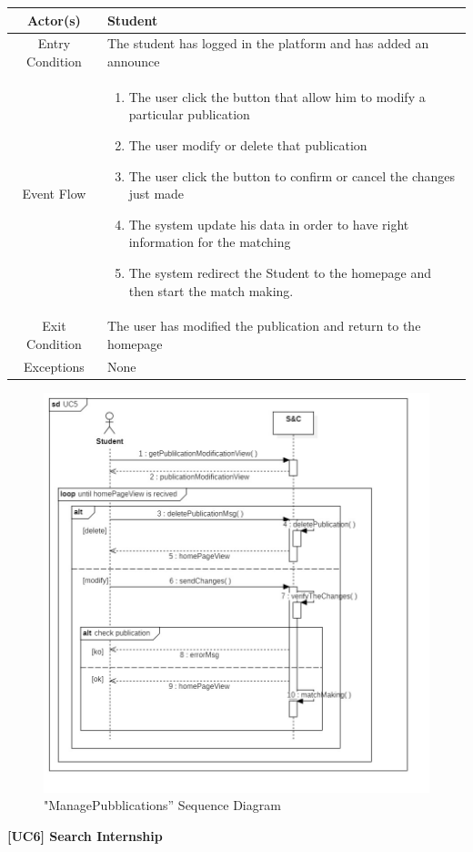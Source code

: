 \documentclass{article}
\begin{document}
\begin{table}[H]
    \centering
    \begin{tabular}{|c|p{10cm}|}
    \hline
        Actor(s)  & Student\\ 
    \hline
        Entry Condition &  
        The student has logged in the platform and has added an announce\\
    \hline
        Event Flow &
        \begin{enumerate}
            \item The user click the button that allow him to modify a particular publication 
            \item The user modify or delete that publication
            \item The user click the button to confirm or cancel the changes just made
            \item The system update his data in order to have right information for the matching
            \item The system redirect the Student to the homepage and then start the match making.
        \end{enumerate}
        \\
    \hline
        Exit Condition & The user has modified the publication and return to the homepage\\
    \hline
        Exceptions &  None\\
    \hline
    \end{tabular}
    \label{tab:my_label}
\end{table}
\begin{figure}[H]
    \centering
    \includegraphics[width=1\linewidth]{sequenceDiagrams/UC5.jpg}
    \caption{"ManagePubblications” Sequence Diagram}
    \label{fig:enter-label}
\end{figure}
\vspace{1cm}
\textbf{[UC6] Search Internship}
\end{document}
